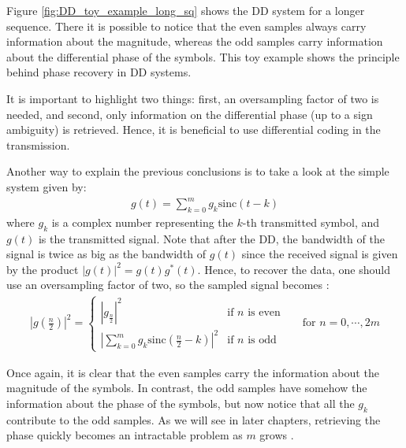 Figure \ref{fig:DD_toy_example_long_sq} shows the DD system for a longer sequence. There it is possible to notice that the even samples always carry information about the magnitude, whereas the odd samples carry information about the differential phase of the symbols. This toy example shows the principle behind phase recovery in DD systems.

It is important to highlight two things: first, an oversampling factor of two is needed, and second, only information on the differential phase (up to a sign ambiguity) is retrieved. Hence, it is beneficial to use differential coding in the transmission.

Another way to explain the previous conclusions is to take a look at the simple system given by:
\begin{align*}
	g(t)=\sum_{k=0}^m g_k\text{sinc}(t-k)
\end{align*}
where $g_k$ is a complex number representing the $k$-th transmitted symbol, and $g(t)$ is the transmitted signal. Note that after the DD, the bandwidth of the signal is twice as big as the bandwidth of $g(t)$ since the received signal is given by the product $|g(t)|^2=g(t)g^*(t)$. Hence, to recover the data, one should use an oversampling factor of two, so the sampled signal becomes \cite{Tasbihi_Tukey}:
\begin{align*}
	\left|g\left(\frac{n}{2}\right)\right|^2 = \left\{
\begin{array}{ll}
\left|g_{\frac{n}{2}}\right|^2  &  \text{if $n$ is even}  \\
\left|\sum\limits_{k=0}^m g_k\text{sinc}\left(\frac{n}{2}-k\right)\right|^2   & \text{if $n$ is odd}
\end{array}
\right. &&\text{for }n=0,\dotsb,2m
\end{align*}%
%

Once again, it is clear that the even samples carry the information about the magnitude of the symbols. In contrast, the odd samples have somehow the information about the phase of the symbols, but now notice that all the $g_k$ contribute to the odd samples. As we will see in later chapters, retrieving the phase quickly becomes an intractable problem as $m$ grows \cite{Tasbihi_Tukey}. 

















